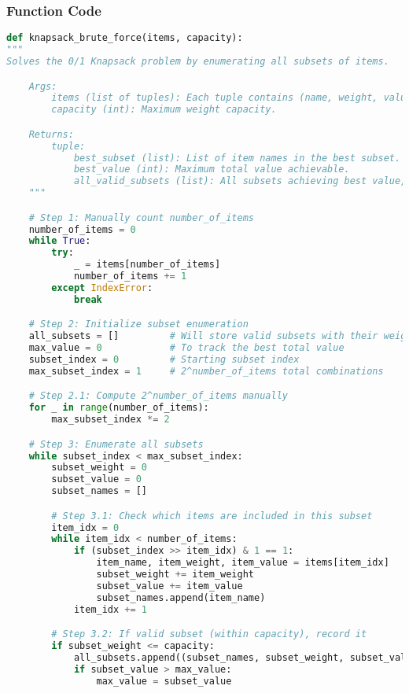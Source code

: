 \documentclass{article}
\begin{document}
\subsubsection*{Function Code}
\begin{lstlisting}[language=Python]
def knapsack_brute_force(items, capacity):
"""
Solves the 0/1 Knapsack problem by enumerating all subsets of items.

    Args:
        items (list of tuples): Each tuple contains (name, weight, value).
        capacity (int): Maximum weight capacity.

    Returns:
        tuple:
            best_subset (list): List of item names in the best subset.
            best_value (int): Maximum total value achievable.
            all_valid_subsets (list): All subsets achieving best value, with weights and values.
    """

    # Step 1: Manually count number_of_items
    number_of_items = 0
    while True:
        try:
            _ = items[number_of_items]
            number_of_items += 1
        except IndexError:
            break

    # Step 2: Initialize subset enumeration
    all_subsets = []         # Will store valid subsets with their weight and value
    max_value = 0            # To track the best total value
    subset_index = 0         # Starting subset index
    max_subset_index = 1     # 2^number_of_items total combinations

    # Step 2.1: Compute 2^number_of_items manually
    for _ in range(number_of_items):
        max_subset_index *= 2

    # Step 3: Enumerate all subsets
    while subset_index < max_subset_index:
        subset_weight = 0
        subset_value = 0
        subset_names = []

        # Step 3.1: Check which items are included in this subset
        item_idx = 0
        while item_idx < number_of_items:
            if (subset_index >> item_idx) & 1 == 1:
                item_name, item_weight, item_value = items[item_idx]
                subset_weight += item_weight
                subset_value += item_value
                subset_names.append(item_name)
            item_idx += 1

        # Step 3.2: If valid subset (within capacity), record it
        if subset_weight <= capacity:
            all_subsets.append((subset_names, subset_weight, subset_value))
            if subset_value > max_value:
                max_value = subset_value


\end{lstlisting}
\end{document}
